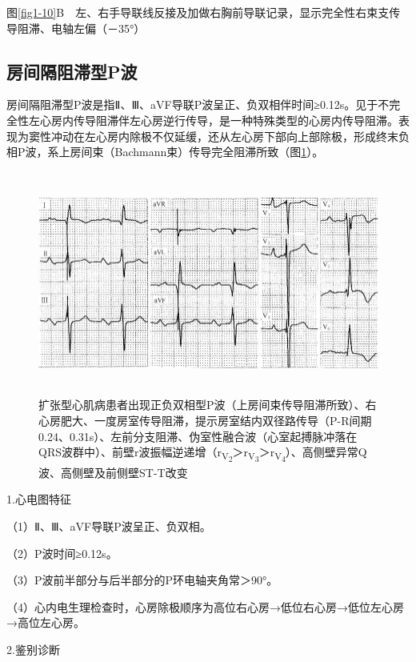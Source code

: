 图\ref{fig1-10}B　左、右手导联线反接及加做右胸前导联记录，显示完全性右束支传导阻滞、电轴左偏（－35°）

\protect\hypertarget{text00007.htmlux5cux23subid11}{}{}

\subsection{房间隔阻滞型P波}

房间隔阻滞型P波是指Ⅱ、Ⅲ、aVF导联P波呈正、负双相伴时间≥0.12s。见于不完全性左心房内传导阻滞伴左心房逆行传导，是一种特殊类型的心房内传导阻滞。表现为窦性冲动在左心房内除极不仅延缓，还从左心房下部向上部除极，形成终末负相P波，系上房间束（Bachmann束）传导完全阻滞所致（图\ref{fig1-11}）。

\begin{figure}[!htbp]
 \centering
 \includegraphics[width=5.72917in,height=2.89583in]{./images/Image00017.jpg}
 \captionsetup{justification=centering}
 \caption{扩张型心肌病患者出现正负双相型P波（上房间束传导阻滞所致）、右心房肥大、一度房室传导阻滞，提示房室结内双径路传导（P-R间期0.24、0.31s）、左前分支阻滞、伪室性融合波（心室起搏脉冲落在QRS波群中）、前壁r波振幅逆递增（r\textsubscript{V\textsubscript{2}}＞r\textsubscript{V\textsubscript{3}}＞r\textsubscript{V\textsubscript{4}}）、高侧壁异常Q波、高侧壁及前侧壁ST-T改变}
 \label{fig1-11}
  \end{figure} 


1.心电图特征

（1）Ⅱ、Ⅲ、aVF导联P波呈正、负双相。

（2）P波时间≥0.12s。

（3）P波前半部分与后半部分的P环电轴夹角常＞90°。

（4）心内电生理检查时，心房除极顺序为高位右心房→低位右心房→低位左心房→高位左心房。

2.鉴别诊断


